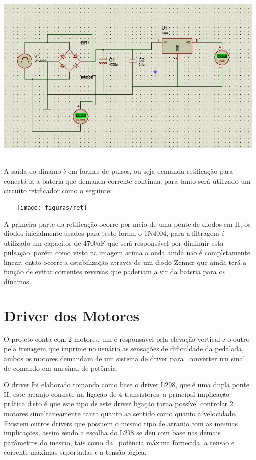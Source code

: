    \begin{center}
        \includegraphics[scale=0.7]{figuras/Fonte-5V}
    \label{Fonte.5V}
\end{center}

A saída do dínamo é em formas de pulsos, ou seja demanda retificação para conectá-la a bateria que demanda corrente contínua, para tanto será utilizado um circuito retificador como o seguinte: 


\begin{center}
    \texttt{[image: figuras/ret]}
       \label{ret}
   \end{center}

A primeira parte da retificação ocorre por meio de uma ponte de diodos em H, os diodos inicialmente usados para teste foram o 1N4004, para a filtragem é utilizado um capacitor de 4700uF que será responsável por diminuir esta pulsação, porém como visto na imagem acima a onda ainda não é completamente linear, então ocorre a estabilização através de um diodo Zenner que ainda terá a função de evitar correntes reversas que poderiam a vir da bateria para os dínamos. 

\section{Driver dos Motores}

O projeto conta com 2 motores, um é responsável pela elevação vertical e o outro pela frenagem que imprime no usuário as sensações de dificuldade da pedalada, ambos os motores demandam de um sistema de driver para  converter um sinal de comando em um sinal de potência. 

O driver foi elaborado tomando como base o driver L298, que é uma dupla ponte H, este arranjo consiste na ligação de 4 transistores, a principal implicação prática disto é que este tipo de este driver ligação torna possível controlar 2 motores simultaneamente tanto quanto ao sentido como quanto a velocidade. Existem outros drivers que possuem o mesmo tipo de arranjo com as mesmas implicações, assim sendo a escolha do L298 se deu com base nos demais parâmetros do mesmo, tais como da  potência máxima fornecida, a tensão e corrente máximas suportadas e a tensão lógica. 

